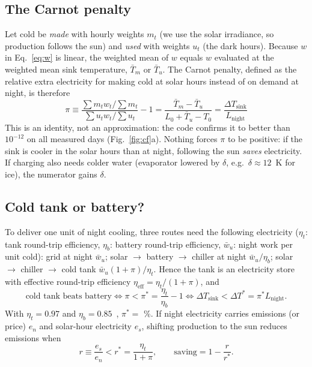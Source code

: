 \documentclass[10pt,a4paper]{article}
\begin{document}
\subsection{The Carnot penalty}
Let cold be \emph{made} with hourly weights $m_t$ (we use the solar irradiance, so production follows the sun) and
\emph{used} with weights $u_t$ (the dark hours). Because $w$ in Eq.~\eqref{eq:w} is linear, the weighted mean of $w$
equals $w$ evaluated at the weighted mean sink temperature, $\bar T_m$ or $\bar T_u$. The Carnot penalty, defined as
the relative extra electricity for making cold at solar hours instead of on demand at night, is therefore
\begin{equation}
\boxed{\;\pi\equiv\frac{\sum m_t w_t/\sum m_t}{\sum u_t w_t/\sum u_t}-1
=\frac{\bar T_m-\bar T_u}{L_0+\bar T_u-T_0}=\frac{\Delta T_{\text{sink}}}{L_{\text{night}}}\;}
\label{eq:pi}
\end{equation}
This is an identity, not an approximation: the code confirms it to better than $10^{-12}$ on all \NDays{} measured
days (Fig.~\ref{fig:cf}a). Nothing forces $\pi$ to be positive: if the sink is cooler in the solar hours than at
night, following the sun \emph{saves} electricity. If charging also needs colder water (evaporator lowered by
$\delta$, e.g.\ $\delta\approx12$~K for ice), the numerator gains $\delta$.

\subsection{Cold tank or battery?}
To deliver one unit of night cooling, three routes need the following electricity ($\eta_t$: tank round-trip
efficiency, $\eta_b$: battery round-trip efficiency, $\bar w_u$: night work per unit cold):
grid at night $\bar w_u$;\; solar $\to$ battery $\to$ chiller at night $\bar w_u/\eta_b$;\; solar $\to$ chiller $\to$
cold tank $\bar w_u(1+\pi)/\eta_t$. Hence the tank is an electricity store with effective round-trip efficiency
$\eta_{\text{eff}}=\eta_t/(1+\pi)$, and
\begin{equation}
\text{cold tank beats battery}\iff\pi<\pi^*=\frac{\eta_t}{\eta_b}-1
\iff\Delta T_{\text{sink}}<\Delta T^*=\pi^*L_{\text{night}} .
\label{eq:batt}
\end{equation}
With $\eta_t=0.97$ and $\eta_b=0.85$~\cite{atb}, $\pi^*=$ \PiStar\%.
If night electricity carries emissions (or price) $e_n$ and solar-hour electricity $e_s$, shifting production to the
sun reduces emissions when
\begin{equation}
r\equiv\frac{e_s}{e_n}<r^*=\frac{\eta_t}{1+\pi},\qquad\text{saving}=1-\frac{r}{r^*}.
\label{eq:clean}
\end{equation}
\end{document}
